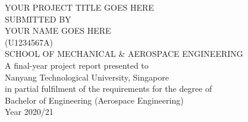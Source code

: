 \begin{titlepage}
\begin{center}

YOUR PROJECT TITLE GOES HERE\\[1.8in]

SUBMITTED BY\\
YOUR NAME GOES HERE\\
(U1234567A)\\[1.8in]

SCHOOL OF MECHANICAL \& AEROSPACE ENGINEERING\\[1.8in]

A final-year project report presented to\\
Nanyang Technological University, Singapore\\
in partial fulfilment of the requirements for the degree of\\
Bachelor of Engineering (Aerospace Engineering)\\[0.3in]

Year 2020/21
\end{center}
\newpage
\end{titlepage}